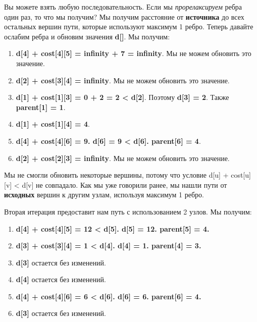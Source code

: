 \vspace{\baselineskip}

Вы можете взять любую последовательность. Если мы \textit{прорелаксируем} ребра один раз, то что мы получим? Мы получим расстояние от \textbf{источника} до всех остальных вершин пути, которые используют максимум 1 ребро. Теперь давайте ослабим ребра и обновим значения \textbf{d[]}. Мы получим:

\begin{enumerate}
    \item \textbf{d[4] + cost[4][5] = infinity + 7 = infinity}. Мы не можем обновить это значение.
    \item \textbf{d[2] + cost[3][4] = infinity}. Мы не можем обновить это значение.
    \item \textbf{d[1] + cost[1][3] = 0 + 2 = 2 < d[2]}. Поэтому \textbf{d[3] = 2}. Также \textbf{parent[1] = 1}.
    \item \textbf{d[1] + cost[1][4] = 4}.
    \item \textbf{d[4] + cost[4][6] = 9. d[6] = 9 < d[6]. parent[6] = 4}.
    \item \textbf{d[2] + cost[2][3] = infinity}. Мы не можем обновить это значение.
\end{enumerate}

Мы не смогли обновить некоторые вершины, потому что условие { d[u] + cost[u][v] < d[v]} не совпадало. Как мы уже говорили ранее, мы нашли пути от \textbf{исходных} вершин к другим узлам, используя максимум 1 ребро.

\begin{center}
\end{center}

Вторая итерация предоставит нам путь с использованием 2 узлов. Мы получим:

\begin{enumerate}
    \item \textbf{d[4] + cost[4][5] = 12 < d[5]. d[5] = 12. parent[5] = 4.}
    \item \textbf{d[3] + cost[3][4] = 1 < d[4]. d[4] = 1. parent[4] = 3.}
    \item \textbf{d[3]} остается без изменений.
    \item \textbf{d[4]} остается без изменений.
    \item \textbf{d[4] + cost[4][6] = 6 < d[6]. d[6] = 6. parent[6] = 4.}
    \item \textbf{d[3]} остается без изменений.
\end{enumerate}

